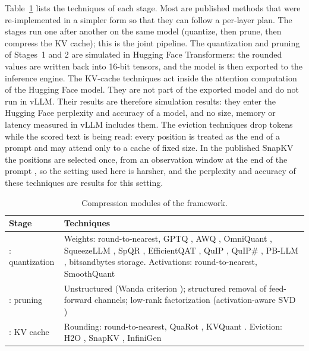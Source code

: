 \documentclass[num-refs]{wiley-article}
\begin{document}
Table~\ref{tab:modules} lists the techniques of each stage. Most are published methods that were re-implemented in a simpler form so that they can follow a per-layer plan. The stages run one after another on the same model (quantize, then prune, then compress the KV cache); this is the joint pipeline. The quantization and pruning of Stages~1 and 2 are simulated in Hugging Face Transformers: the rounded values are written back into 16-bit tensors, and the model is then exported to the inference engine. The KV-cache techniques act inside the attention computation of the Hugging Face model. They are not part of the exported model and do not run in vLLM. Their results are therefore simulation results: they enter the Hugging Face perplexity and accuracy of a model, and no size, memory or latency measured in vLLM includes them. The eviction techniques drop tokens while the scored text is being read: every position is treated as the end of a prompt and may attend only to a cache of fixed size. In the published SnapKV the positions are selected once, from an observation window at the end of the prompt \cite{li2024snapkv}, so the setting used here is harsher, and the perplexity and accuracy of these techniques are results for this setting.

\begin{table}[tp]
\caption{Compression modules of the framework.}
\label{tab:modules}
\small
\renewcommand{\arraystretch}{1.15}
\begin{tabularx}{\textwidth}{>{\raggedright\arraybackslash}p{2.4cm}>{\raggedright\arraybackslash}X}
\hline
\textbf{Stage} & \textbf{Techniques} \\
\hline
1: quantization & Weights: round-to-nearest, GPTQ \cite{frantar2023gptq}, AWQ \cite{lin2024awq}, OmniQuant \cite{shao2024omniquant}, SqueezeLLM \cite{kim2024squeezellm}, SpQR \cite{dettmers2024spqr}, EfficientQAT \cite{chen2025efficientqat}, QuIP \cite{chee2023quip}, QuIP\# \cite{tseng2024quipsharp}, PB-LLM \cite{shang2023pbllm}, bitsandbytes storage. Activations: round-to-nearest, SmoothQuant \cite{xiao2023smoothquant} \\
2: pruning & Unstructured (Wanda criterion \cite{sun2024wanda}); structured removal of feed-forward channels; low-rank factorization (activation-aware SVD \cite{yuan2025asvd}) \\
3: KV cache & Rounding: round-to-nearest, QuaRot \cite{ashkboos2024quarot}, KVQuant \cite{hooper2024kvquant}. Eviction: H2O \cite{zhang2023h2o}, SnapKV \cite{li2024snapkv}, InfiniGen \cite{lee2024infinigen} \\
\hline
\end{tabularx}
\end{table}
\end{document}
